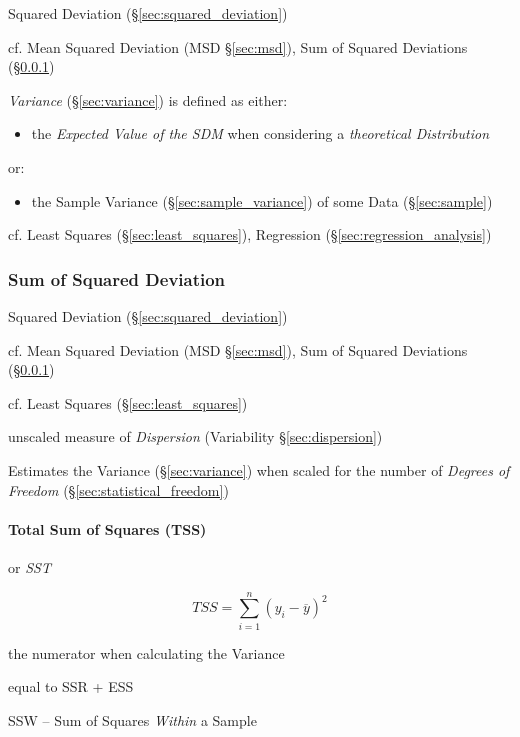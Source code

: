 \fist Squared Deviation (\S\ref{sec:squared_deviation})

cf. Mean Squared Deviation (MSD \S\ref{sec:msd}), Sum of Squared
Deviations (\S\ref{sec:sum_squared_deviation})

\emph{Variance} (\S\ref{sec:variance}) is defined as either:
\begin{itemize}
  \item the \emph{Expected Value of the SDM} when considering a
    \emph{theoretical Distribution}
\end{itemize}
or:
\begin{itemize}
  \item the Sample Variance (\S\ref{sec:sample_variance}) of some Data
    (\S\ref{sec:sample})
\end{itemize}

cf. Least Squares (\S\ref{sec:least_squares}), Regression
(\S\ref{sec:regression_analysis})



\subsubsection{Sum of Squared Deviation}\label{sec:sum_squared_deviation}

\fist Squared Deviation (\S\ref{sec:squared_deviation})

cf. Mean Squared Deviation (MSD \S\ref{sec:msd}), Sum of Squared
Deviations (\S\ref{sec:sum_squared_deviation})

\fist cf. Least Squares (\S\ref{sec:least_squares})

unscaled measure of \emph{Dispersion} (Variability \S\ref{sec:dispersion})

Estimates the Variance (\S\ref{sec:variance}) when scaled for the number of
\emph{Degrees of Freedom} (\S\ref{sec:statistical_freedom})



\paragraph{Total Sum of Squares (TSS)}\label{sec:tss}\hfill

or \emph{SST}

\[
  TSS = \sum_{i=1}^n (y_i - \overline{y})^2
\]

the numerator when calculating the Variance

equal to SSR + ESS

SSW -- Sum of Squares \emph{Within} a Sample

